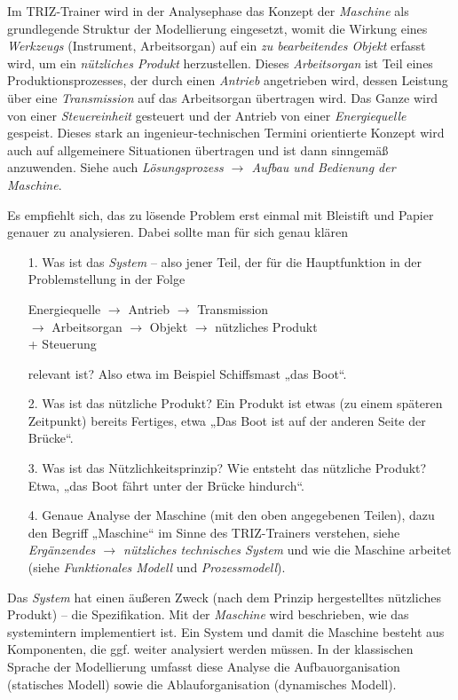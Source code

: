 \documentclass[11pt,a4paper]{article}
\begin{document}
Im TRIZ-Trainer wird in der Analysephase das Konzept der \emph{Maschine} als
grundlegende Struktur der Modellierung eingesetzt, womit die Wirkung eines
\emph{Werkzeugs} (Instrument, Arbeitsorgan) auf ein \emph{zu bearbeitendes
  Objekt} erfasst wird, um ein \emph{nützliches Produkt} herzustellen.  Dieses
\emph{Arbeitsorgan} ist Teil eines Produktionsprozesses, der durch einen
\emph{Antrieb} angetrieben wird, dessen Leistung über eine \emph{Transmission}
auf das Arbeitsorgan übertragen wird.  Das Ganze wird von einer
\emph{Steuereinheit} gesteuert und der Antrieb von einer \emph{Energiequelle}
gespeist.  Dieses stark an ingenieur-technischen Termini orientierte Konzept
wird auch auf allgemeinere Situationen übertragen und ist dann sinngemäß
anzuwenden.  Siehe auch \emph{Lösungsprozess $\to$ Aufbau und Bedienung der
  Maschine}.

Es empfiehlt sich, das zu lösende Problem erst einmal mit Bleistift und Papier
genauer zu analysieren. Dabei sollte man für sich genau klären
\begin{itemize}
\item[1.] Was ist das \emph{System} -- also jener Teil, der für die
  Hauptfunktion in der Problemstellung in der Folge 
  \begin{center}
    Energiequelle $\to$ Antrieb $\to$ Transmission\\ $\to$ Arbeitsorgan $\to$
    Objekt $\to$ nützliches Produkt\\ + Steuerung
  \end{center}
  relevant ist? Also etwa im Beispiel Schiffsmast „das Boot“.

\item[2.] Was ist das nützliche Produkt? Ein Produkt ist etwas (zu einem
  späteren Zeitpunkt) bereits Fertiges, etwa „Das Boot ist auf der anderen
  Seite der Brücke“.

\item[3.] Was ist das Nützlichkeitsprinzip? Wie entsteht das nützliche
  Produkt? Etwa, „das Boot fährt unter der Brücke hindurch“.

\item[4.] Genaue Analyse der Maschine (mit den oben angegebenen Teilen), dazu
  den Begriff „Maschine“ im Sinne des TRIZ-Trainers verstehen, siehe
  \emph{Ergänzendes $\to$ nützliches technisches System} und wie die Maschine
  arbeitet (siehe \emph{Funktionales Modell} und \emph{Prozessmodell}).
\end{itemize}
Das \emph{System} hat einen äußeren Zweck (nach dem Prinzip hergestelltes
nützliches Produkt) -- die Spezifikation. Mit der \emph{Maschine} wird
beschrieben, wie das systemintern implementiert ist. Ein System und damit die
Maschine besteht aus Komponenten, die ggf. weiter analysiert werden müssen.
In der klassischen Sprache der Modellierung umfasst diese Analyse die
Aufbauorganisation (statisches Modell) sowie die Ablauforganisation
(dynamisches Modell).
\end{document}

